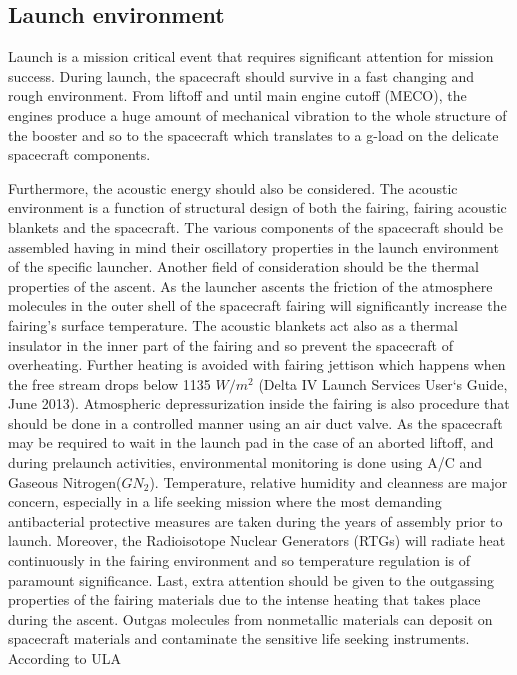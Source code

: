 \subsection{Launch environment}
Launch is a mission critical event that requires significant attention for mission success. During launch, the spacecraft should survive in a fast changing and rough environment. From liftoff and until main engine cutoff (MECO), the engines produce a huge amount of mechanical vibration to the whole structure of the booster and so to the spacecraft which translates to a g-load on the delicate spacecraft components. 

Furthermore, the acoustic energy should also be considered. The acoustic environment is a function of structural design of both the fairing, fairing acoustic blankets and the spacecraft. The various components of the spacecraft should be assembled having in mind their oscillatory properties in the launch environment of the specific launcher. Another field of consideration should be the thermal properties of the ascent. As the launcher ascents the friction of the atmosphere molecules in the outer shell of the spacecraft fairing will significantly increase the fairing’s surface temperature. The acoustic blankets act also as a thermal insulator in the inner part of the fairing and so prevent the spacecraft of overheating. Further heating is avoided with fairing jettison which happens when the free stream drops below 1135 $W/m^2$ (Delta IV Launch Services User‘s Guide, June 2013).
Atmospheric depressurization inside the fairing is also procedure that should be done in a controlled manner using an air duct valve. As the spacecraft may be required to wait in the launch pad in the case of an aborted liftoff, and during prelaunch activities, environmental monitoring is done using A/C and Gaseous Nitrogen($GN_2$). Temperature, relative humidity and cleanness are major concern, especially in a life seeking mission where the most demanding antibacterial protective measures are taken during the years of assembly prior to launch. Moreover, the Radioisotope Nuclear Generators (RTGs) will radiate heat continuously in the fairing environment and so temperature regulation is of paramount significance. Last, extra attention should be given to the outgassing properties of the fairing materials due to the intense heating that takes place during the ascent. Outgas molecules from nonmetallic materials can deposit on spacecraft materials and contaminate the sensitive life seeking instruments. According to ULA

